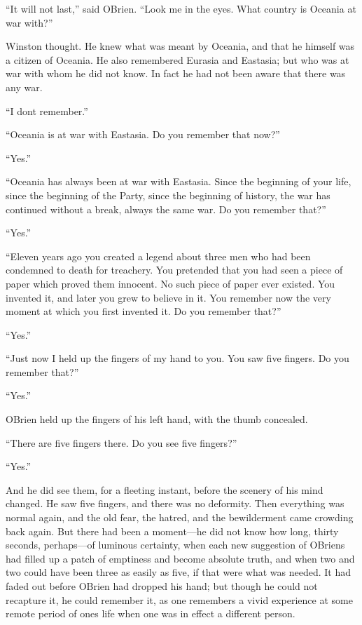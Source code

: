 ``It will not last,'' said O\textquotesingle Brien. ``Look me in the eyes.
What country is Oceania at war with?''

Winston thought. He knew what was meant by Oceania, and that he himself
was a citizen of Oceania. He also remembered Eurasia and Eastasia; but
who was at war with whom he did not know. In fact he had not been aware
that there was any war.

``I don\textquotesingle t remember.''

``Oceania is at war with Eastasia. Do you remember that now?''

``Yes.''

``Oceania has always been at war with Eastasia. Since the beginning of
your life, since the beginning of the Party, since the beginning of
history, the war has continued without a break, always the same war. Do
you remember that?''

``Yes.''

``Eleven years ago you created a legend about three men who had been
condemned to death for treachery. You pretended that you had seen a
piece of paper which proved them innocent. No such piece of paper ever
existed. You invented it, and later you grew to believe in it. You
remember now the very moment at which you first invented it. Do you
remember that?''

``Yes.''

``Just now I held up the fingers of my hand to you. You saw five fingers.
Do you remember that?''

``Yes.''

O\textquotesingle Brien held up the fingers of his left hand, with the
thumb concealed.

``There are five fingers there. Do you see five fingers?''

``Yes.''

And he did see them, for a fleeting instant, before the scenery of his
mind changed. He saw five fingers, and there was no deformity. Then
everything was normal again, and the old fear, the hatred, and the
bewilderment came crowding back again. But there had been a moment---he
did not know how long, thirty seconds, perhaps---of luminous certainty,
when each new suggestion of O\textquotesingle Brien\textquotesingle s
had filled up a patch of emptiness and become absolute truth, and when
two and two could have been three as easily as five, if that were what
was needed. It had faded out before O\textquotesingle Brien had dropped
his hand; but though he could not recapture it, he could remember it, as
one remembers a vivid experience at some remote period of
one\textquotesingle s life when one was in effect a different person.

